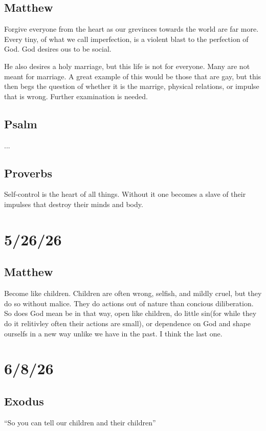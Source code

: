 \subsection{Matthew}

Forgive everyone from the heart as our grevinces towards the world are far more. Every tiny, of what we call imperfection, is a violent blast to the perfection of God. God desires ous to be social.

He also desires a holy marriage, but this life is not for everyone. Many are not meant for marriage. A great example of this would be those that are gay, but this then begs the question of whether it is the marrige, physical relations, or impulse that is wrong. Further examination is needed.

\subsection{Psalm}
...
\subsection{Proverbs}

Self-control is the heart of all things. Without it one becomes a slave of their impulses that destroy their minds and body.

\section{5/26/26}
\subsection{Matthew}
Become like children. Children are often wrong, selfish, and mildly cruel, but they do so without malice. They do actions out of nature than concious diliberation. So does God mean be in that way, open like children, do little sin(for while they do it relitivley often their actions are small), or dependence on God and shape ourselfs in a new way unlike we have in the past. I think the last one.


\section{6/8/26}
\subsection{Exodus}
``So you can tell our children and their children''

